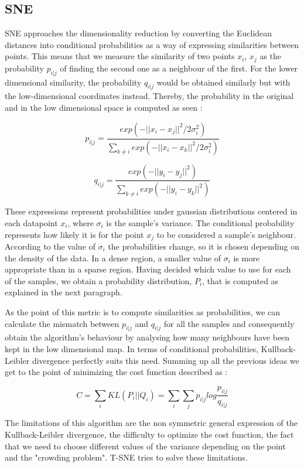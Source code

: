 \documentclass[a4paper,11pt,spanish]{report}
\begin{document}
\subsection{SNE}
\label{ssec:sne}

SNE approaches the dimensionality reduction by converting the Euclidean distances into conditional probabilities as a way of expressing similarities between points. This means that we measure the similarity of two points $x_{i}$, $x_{j}$ as the probability $p_{i|j}$ of finding the second one as a neighbour of the first. For the lower dimensional similarity, the probability $q_{i|j}$ would be obtained similarly but with the low-dimensional coordinates instead. Thereby, the probability in the original and in the low dimensional space is computed as seen \citep{tsne}:

$$ p_{i|j} = \frac{exp(-||x_{i}-x_{j}||^{2}/2\sigma_{i}^{2})}{\sum _{k\neq i} exp (-||x_{i}-x_{k}||^{2}/2\sigma_{i}^{2})}$$

$$ q_{i|j} = \frac{exp(-||y_{i}-y_{j}||^{2})}{\sum _{k\neq i} exp (-||y_{i}-y_{k}||^{2})} $$

These expressions represent probabilities under gaussian distributions centered in each datapoint $x_{i}$, where $\sigma_{i}$ is the sample's variance. The conditional probability represents how likely it is for the point $x_{j}$ to be considered a sample's neighbour. According to the value of $\sigma_{i}$ the probabilities change, so it is chosen depending on the density of the data. In a dense region, a smaller value of $\sigma_{i}$ is more appropriate than in a sparse region. Having decided which value to use for each of the samples, we obtain a probability distribution, $P_{i}$, that is computed as explained in the next paragraph.

As the point of this metric is to compute similarities as probabilities, we can calculate the mismatch between $p_{i|j}$ and $q_{i|j}$ for all the samples and consequently obtain the algorithm's behaviour by analysing how many neighbours have been kept in the low dimensional map. In terms of conditional probabilities, Kullback-Leibler divergence perfectly suits this need. Summing up all the previous ideas we get to the point of minimizing the cost function described as \citep{tsne}:

$$ C = \sum\limits_{i} KL(P_{i}||Q_{i}) = \sum\limits_{i} \sum\limits_{j} p_{i|j} log \frac{p_{i|j}}{q_{i|j}}$$

The limitations of this algorithm are the non symmetric general expression of the Kullback-Leibler divergence, the difficulty to optimize the cost function, the fact that we need to choose different values of the variance depending on the point and the "crowding problem". T-SNE tries to solve these limitations.
\end{document}
